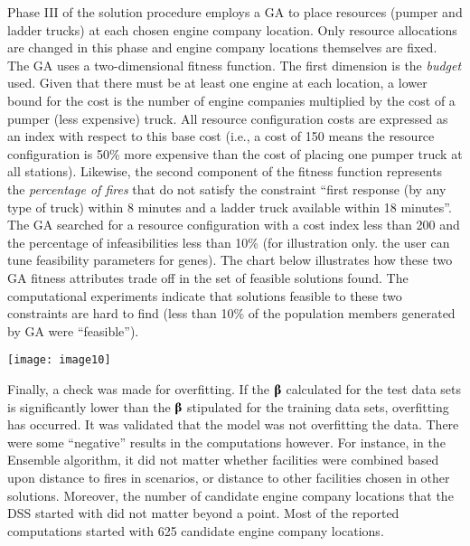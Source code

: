 \documentclass{article} %
\begin{document}
\noindent Phase III of the solution procedure employs a GA to place resources (pumper and ladder trucks) at each chosen engine company location.  Only resource allocations are changed in this phase and engine company locations themselves are fixed.  The GA uses a two-dimensional fitness function.  The first dimension is the \textit{budget }used.  Given that there must be at least one engine at each location, a lower bound for the cost is the number of engine companies multiplied by the cost of a pumper (less expensive) truck.  All resource configuration costs are expressed as an index with respect to this base cost (i.e., a cost of 150 means the resource configuration is 50\% more expensive than the cost of placing one pumper truck at all stations).  Likewise, the second component of the fitness function represents the \textit{percentage of fires} that do not satisfy the constraint ``first response (by any type of truck) within 8 minutes and a ladder truck available within 18 minutes''.  The GA searched for a resource configuration with a cost index less than 200 and the percentage of infeasibilities less than 10\% (for illustration only.  the user can tune feasibility parameters for genes).  The chart below illustrates how these two GA fitness attributes trade off in the set of feasible solutions found.   The computational experiments indicate that solutions feasible to these two constraints are hard to find (less than 10\% of the population members generated by GA were ``feasible'').

\noindent \texttt{[image: image10]}

\noindent 

\noindent Finally, a check was made for overfitting.  If the \textbf{$\boldsymbol{\betaup}$ }calculated\textbf{ }for the test data sets is significantly lower than the \textbf{$\boldsymbol{\betaup}$ }stipulated for the training data sets, overfitting has occurred.  It was validated that the model was not overfitting the data.  There were some ``negative'' results in the computations however.  For instance, in the Ensemble algorithm, it did not matter whether facilities were combined based upon distance to fires in scenarios, or distance to other facilities chosen in other solutions.  Moreover, the number of candidate engine company locations that the DSS started with did not matter beyond a point.  Most of the reported computations started with 625 candidate engine company locations.

\noindent 
\end{document}
